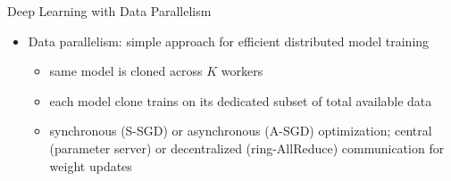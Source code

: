 \begin{frame}{Deep Learning with Data Parallelism}
\protect\hypertarget{deep-learning-with-data-parallelism-2}{}

\begin{itemize}
\tightlist
\item
  Data parallelism: simple approach for efficient distributed model
  training

  \begin{itemize}
  \tightlist
  \item
    same model is cloned across \(K\) workers
  \item
    each model clone trains on its dedicated subset of total available
    data
  \item
    synchronous (S-SGD) or asynchronous (A-SGD) optimization; central
    (parameter server) or decentralized (ring-AllReduce) communication
    for weight updates
  \end{itemize}
\end{itemize}


\end{frame}

